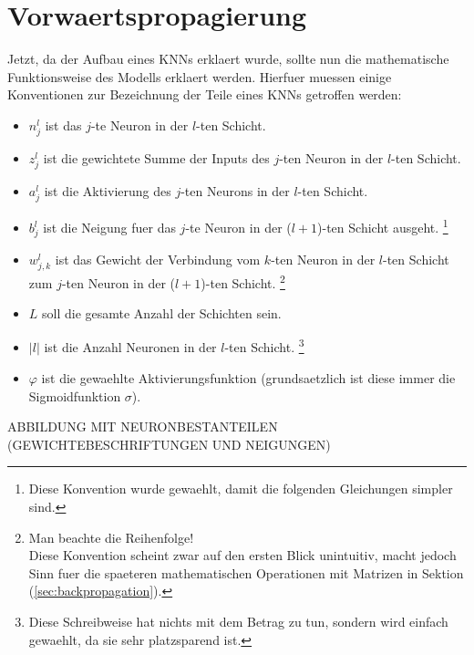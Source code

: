 \section{Vorwaertspropagierung}
Jetzt, da der Aufbau eines KNNs erklaert wurde, sollte nun die mathematische Funktionsweise
des Modells erklaert werden. Hierfuer muessen einige Konventionen zur
Bezeichnung der Teile eines KNNs getroffen werden:

\begin{itemize}

\item{$n_j^l$ ist das $j$-te Neuron in der $l$-ten Schicht.}
\item{$z_j^l$ ist die gewichtete Summe der Inputs des $j$-ten Neuron in der $l$-ten Schicht.}
\item{$a_j^l$ ist die Aktivierung des $j$-ten Neurons in der $l$-ten Schicht.}
\item{$b_j^l$ ist die Neigung fuer das $j$-te Neuron in der ($l+1$)-ten Schicht ausgeht.
    \footnote{
      Diese Konvention wurde gewaehlt, damit die folgenden Gleichungen simpler sind.
    }
  }
\item{$w_{j,k}^l$ ist das Gewicht der Verbindung vom $k$-ten Neuron
    in der $l$-ten Schicht zum $j$-ten Neuron in der ($l+1$)-ten Schicht.
    \footnote{
      Man beachte die Reihenfolge!\\
      Diese Konvention scheint zwar auf den ersten Blick unintuitiv, macht jedoch
      Sinn fuer die spaeteren mathematischen Operationen mit Matrizen in Sektion
      (\ref{sec:backpropagation}).
    }}

\item{$L$ soll die gesamte Anzahl der Schichten sein.}

\item{$|l|$ ist die Anzahl Neuronen in der $l$-ten Schicht.
    \footnote{
      Diese Schreibweise hat nichts mit dem Betrag zu tun, sondern wird einfach
      gewaehlt, da sie sehr platzsparend ist.
    }
  }

\item{$\varphi$ ist die gewaehlte Aktivierungsfunktion (grundsaetzlich ist diese
    immer die Sigmoidfunktion $\sigma$).}

\end{itemize}

ABBILDUNG MIT NEURONBESTANTEILEN (GEWICHTEBESCHRIFTUNGEN UND NEIGUNGEN)

